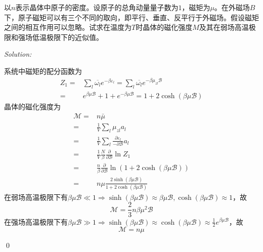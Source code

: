 \documentclass[12pt,a4paper]{article}
\newenvironment{problem}[2][Problem]{\begin{trivlist}
\item[\hskip \labelsep {\bfseries #1}\hskip \labelsep {\bfseries #2.}]}{\end{trivlist}}
\newenvironment{sol}
    {\emph{Solution:}
    }
    {
    \qed
    }
\begin{document}
\begin{problem}{7.22}
以$n$表示晶体中原子的密度。设原子的总角动量量子数为$1$，磁矩为$\mu$。在外磁场$B$下，原子磁矩可以有三个不同的取向，即平行、垂直、反平行于外磁场。假设磁矩之间的相互作用可以忽略。试求在温度为$T$时晶体的磁化强度$M$及其在弱场高温极限和强场低温极限下的近似值。
\end{problem}
\begin{sol}
系统中磁矩的配分函数为
\begin{align}
\nonumber Z_1=&\sum_l\overline{\omega_l}e^{-\beta\varepsilon_l}=\sum_l\overline{\omega_l}e^{-\beta\mu_{zl}\mathcal{B}}\\
=&e^{\beta\mu\mathcal{B}}+1+e^{-\beta\mu\mathcal{B}}=1+2\cosh(\beta\mu\mathcal{B})
\end{align}
晶体的磁化强度为
\begin{align}
\nonumber\mathcal{M}=&n\bar{\mu}\\
\nonumber=&\frac{1}{V}\sum_l\mu_{zl}a_l\\
\nonumber=&\frac{1}{V}\sum_l\frac{\partial\varepsilon_l}{-\partial\mathcal{B}}a_l\\
\nonumber=&\frac{1}{V}\frac{N}{\beta}\frac{\partial}{\partial\mathcal{B}}\ln Z_1\\
\nonumber=&\frac{n}{\beta}\frac{\partial}{\partial\mathcal{B}}\ln(1+2\cosh(\beta\mu\mathcal{B}))\\
=&n\mu\frac{2\sinh(\beta\mu\mathcal{B})}{1+2\cosh(\beta\mu\mathcal{B})}
\end{align}
在弱场高温极限下有$\beta\mu\mathcal{B}\ll1\Longrightarrow\sinh(\beta\mu\mathcal{B})\approx\beta\mu\mathcal{B},\cosh(\beta\mu\mathcal{B})\approx1$，故
\begin{equation}
\mathcal{M}=\frac{2}{3}n\beta\mu^2\mathcal{B}
\end{equation}
在强场高温极限下有$\beta\mu\mathcal{B}\gg1\Longrightarrow\sinh(\beta\mu\mathcal{B})\approx\cosh(\beta\mu\mathcal{B})\approx\frac{1}{2}e^{\beta\mu\mathcal{B}}$，故
\begin{equation}
\mathcal{M}=n\mu
\end{equation}
\end{sol}
\end{document}

